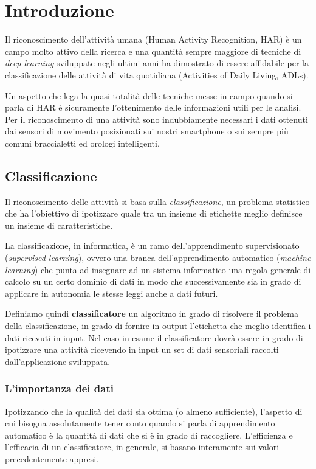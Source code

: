 \chapter{Introduzione}

Il riconoscimento dell'attività umana (Human Activity Recognition, HAR) è un campo molto attivo della ricerca e una
quantità sempre maggiore di tecniche di \textit{deep learning} sviluppate negli ultimi anni ha dimostrato di essere 
affidabile per la classificazione delle attività di vita quotidiana (Activities of Daily Living, ADLs).

Un aspetto che lega la quasi totalità delle tecniche messe in campo quando si parla di HAR è sicuramente l'ottenimento delle informazioni 
utili per le analisi. Per il riconoscimento di una attività sono indubbiamente necessari i dati ottenuti dai
sensori di movimento posizionati sui nostri smartphone o sui sempre più comuni braccialetti ed orologi intelligenti.

\section{Classificazione}
Il riconoscimento delle attività si basa sulla \textit{classificazione}, un problema statistico che ha l'obiettivo di ipotizzare 
quale tra un insieme di etichette meglio definisce un insieme di caratteristiche. 

La classificazione, in informatica, è un ramo dell'apprendimento supervisionato (\textit{supervised learning}),
ovvero una branca dell'apprendimento automatico (\textit{machine learning}) che punta ad insegnare ad un sistema informatico una regola generale
di calcolo su un certo dominio di dati in modo che successivamente sia in grado di applicare in autonomia le stesse leggi anche a dati futuri.

Definiamo quindi \textbf{classificatore} un algoritmo in grado di risolvere il problema della classificazione, in grado di fornire in output 
l'etichetta che meglio identifica i dati ricevuti in input.
Nel caso in esame il classificatore dovrà essere in grado di ipotizzare una attività ricevendo in input un set di dati sensoriali
raccolti dall'applicazione sviluppata.

\subsection{L'importanza dei dati}
Ipotizzando che la qualità dei dati sia ottima (o almeno sufficiente), l'aspetto di cui bisogna assolutamente tener conto quando 
si parla di apprendimento automatico è la quantità di dati che si è in grado di raccogliere. 
L'efficienza e l'efficacia di un classificatore, in generale, si basano interamente sui valori precedentemente appresi.

